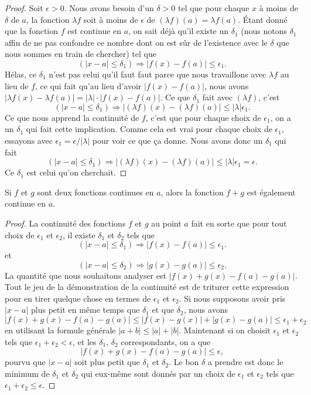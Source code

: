 \begin{proof}
Soit $\epsilon>0$. Nous avons besoin d'un $\delta>0$ tel que pour chaque $x$ à moins de $\delta$ de $a$, la fonction $\lambda f$ soit à moins de $\epsilon$ de $(\lambda f)(a)=\lambda f(a)$. Étant donné que la fonction $f$ est continue en $a$, on sait déjà qu'il existe un $\delta_1$ (nous notons $\delta_1$ affin de ne pas confondre ce nombre dont on est sûr de l'existence avec le $\delta$ que nous sommes en train de chercher) tel que 
\[ 
  (| x-a |\leq \delta_1)\Rightarrow | f(x)-f(a) |\leq \epsilon_1.
\]
Hélas, ce $\delta_1$ n'est pas celui qu'il faut faut parce que nous travaillons avec $\lambda f$ au lieu de $f$, ce qui fait qu'au lieu d'avoir $| f(x)-f(a) |$, nous avons $| \lambda f(x)-\lambda f(a) |=| \lambda |\cdot | f(x)-f(a) |$.  Ce que $\delta_1$ fait avec $(\lambda f)$, c'est
\[ 
  (| x-a |\leq\delta_1)\Rightarrow  | (\lambda f)(x)- (\lambda f)(a)|\leq | \lambda |\epsilon_1.
\]
Ce que nous apprend la continuité de $f$, c'est que pour chaque choix de $\epsilon_1$, on a un $\delta_1$ qui fait cette implication. Comme cela est vrai pour chaque choix de $\epsilon_1$, essayons avec $\epsilon_1=\epsilon/| \lambda |$ pour voir ce que ça donne. Nous avons donc un $\delta_1$ qui fait
\[ 
  (| x-a |\leq\delta_1)\Rightarrow  | (\lambda f)(x)- (\lambda f)(a)|\leq | \lambda |\epsilon_1=\epsilon.
\]
Ce $\delta_1$ est celui qu'on cherchait. 
\end{proof}

\begin{theorem}
Si $f$ et $g$ sont deux fonctions continues en $a$, alors la fonction $f+g$ est également continue en $a$.
\end{theorem}

\begin{proof}
La continuité des fonctions $f$ et $g$ au point $a$ fait en sorte que pour tout choix de $\epsilon_1$ et $\epsilon_2$, il existe $\delta_1$ et $\delta_2$ tels que 
\[ 
  (| x-a |\leq \delta_1)\Rightarrow | f(x)-f(a) |\leq \epsilon_1.
\]
et
\[ 
  (| x-a |\leq \delta_2)\Rightarrow | g(x)-g(a) |\leq \epsilon_2.
\]
La quantité que nous souhaitons analyser est $| f(x)+g(x)-f(a)-g(a) |$. Tout le jeu de la démonstration de la continuité est de triturer cette expression pour en tirer quelque chose en termes de $\epsilon_1$ et $\epsilon_2$. Si nous supposons avoir pris $| x-a |$ plus petit en même temps que $\delta_1$ et que $\delta_2$, nous avons
\[
| f(x)+g(x)-f(a)-g(a) |\leq| f(x)-g(x) |+| g(x)-g(a) |\leq\epsilon_1+\epsilon_2 
\]
en utilisant la formule générale $| a+b |\leq | a |+| b |$. Maintenant si on choisit $\epsilon_1$ et $\epsilon_2$ tels que $\epsilon_1+\epsilon_2<\epsilon$, et les $\delta_1$, $\delta_2$ correspondants, on a que 
\[
| f(x)+g(x)-f(a)-g(a) |\leq\epsilon,
\]
pourvu que $| x-a |$ soit plus petit que $\delta_1$ et $\delta_2$. Le bon $\delta$ a prendre est donc le minimum de $\delta_1$ et $\delta_2$ qui eux-même sont donnés par un choix de $\epsilon_1$ et $\epsilon_2$ tels que $\epsilon_1+\epsilon_2\leq\epsilon$.
\end{proof}

